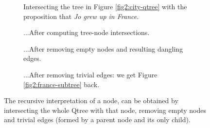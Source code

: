 \begin{figure}[H]
	\centering
	\begin{subfigure}[t]{\linewidth}
		\centering
		\caption{Intersecting the tree in Figure \ref{fig2:city-qtree} with the proposition that \textit{Jo grew up in France}.}
	\end{subfigure}
	
	\begin{subfigure}[t]{.33\linewidth}
		\centering		{}
		\caption{...After computing tree-node intersections.}
	\end{subfigure}
	\hfill
	\begin{subfigure}[t]{.27\linewidth}
		\centering		{}
		\caption{...After removing empty nodes and resulting dangling edges.}
	\end{subfigure}
	\hfill
	\begin{subfigure}[t]{.3\linewidth}
		\centering 		{}
		\caption{...After removing trivial edges: we get Figure \ref{fig2:france-subtree} back.}
	\end{subfigure}
	\caption{The recursive interpretation of a node, can be obtained by intersecting the whole Qtree with that node, removing empty nodes and trivial edges (formed by a parent node and its only child).}\label{fig2:tree-node-inter}
\end{figure}

